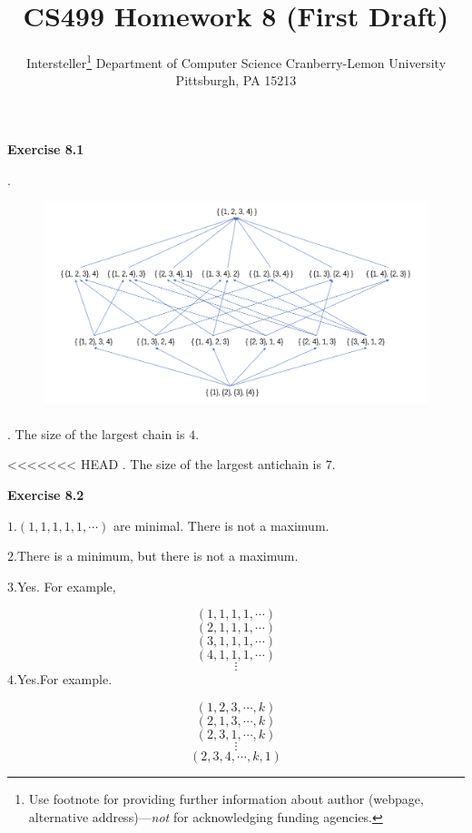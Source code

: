 \documentclass{article} %
\title{CS499 Homework 8 (First Draft)}
\author{
	Intersteller\thanks{ Use footnote for providing further information
		about author (webpage, alternative address)---\emph{not} for acknowledging
		funding agencies.}
	Department of Computer Science
	Cranberry-Lemon University
	Pittsburgh, PA 15213
}
\begin{document}
	\maketitle
	\textbf{Exercise 8.1}\par
	.\par
  	\begin{figure}[H]
  	\centering
  	\includegraphics[scale=0.5]{8_1.png}
  	\caption{}
  	\label{}
  	\end{figure}
	. The size of the largest chain is $4$.\par
<<<<<<< HEAD
	 . The size of the largest antichain is $7$.\par 

\textbf{Exercise 8.2}\par
    $1.(1,1,1,1,1,\cdots)$ are minimal. There is not a maximum.\par
    $2.$There is a minimum, but there is not a maximum.\par
    $3.$Yes. For example,\par
    $$(1,1,1,1,\cdots)$$
    $$(2,1,1,1,\cdots)$$
    $$(3,1,1,1,\cdots)$$
    $$(4,1,1,1,\cdots)$$
    $$\vdots$$
    $4.$Yes.For example.\par
    $$(1,2,3,\cdots,k)$$
    $$(2,1,3,\cdots,k)$$
    $$(2,3,1,\cdots,k)$$
    $$\vdots$$
    $$(2,3,4,\cdots,k,1)$$
\end{document}
